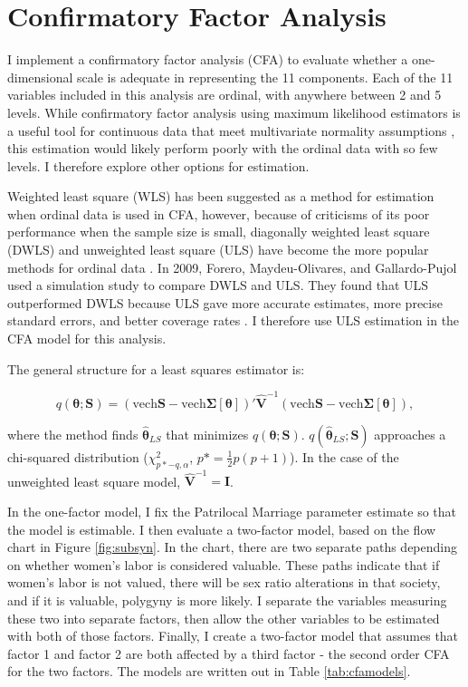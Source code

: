 \documentclass[letterpaper,11pt]{article}
\begin{document}
\section{Confirmatory Factor Analysis}

I implement a confirmatory factor analysis (CFA) to evaluate whether a one-dimensional scale is adequate in representing the 11 components. Each of the 11 variables included in this analysis are ordinal, with anywhere between 2 and 5 levels. While confirmatory factor analysis using maximum likelihood estimators is a useful tool for continuous data that meet multivariate normality assumptions \cite{albright}, this estimation would likely perform poorly with the ordinal data with so few levels. I therefore explore other options for estimation.

Weighted least square (WLS) has been suggested as a method for estimation when ordinal data is used in CFA, however, because of criticisms of its poor performance when the sample size is small, diagonally weighted least square (DWLS) and unweighted least square (ULS) have become the more popular methods for ordinal data \cite{li}. In 2009, Forero, Maydeu-Olivares, and Gallardo-Pujol used a simulation study to compare DWLS and ULS. They found that ULS outperformed DWLS because ULS gave more accurate estimates, more precise standard errors, and better coverage rates \cite{forero}. I therefore use ULS estimation in the CFA model for this analysis.

The general structure for a least squares estimator is:

\begin{equation}
q(\boldsymbol{\theta};\mathbf{S}) = (\text{vech} \mathbf{S} - \text{vech} \boldsymbol{\Sigma}[\boldsymbol{\theta}])' \hat{\mathbf{V}}^{-1}(\text{vech} \mathbf{S} - \text{vech} \boldsymbol{\Sigma}[\boldsymbol{\theta}]),
\end{equation}

where the method finds $\hat{\boldsymbol{\theta}}_{LS}$ that minimizes $q(\boldsymbol{\theta};\mathbf{S})$. $q(\hat{\boldsymbol{\theta}}_{LS};\mathbf{S})$ approaches a chi-squared distribution ($\chi^2_{p*-q,\alpha}$, $p*=\frac{1}{2}p(p+1)$). In the case of the unweighted least square model, $\hat{\mathbf{V}}^{-1}=\mathbf{I}$.

In the one-factor model, I fix the Patrilocal Marriage parameter estimate so that the model is estimable. I then evaluate a two-factor model, based on the flow chart in Figure \ref{fig:subsyn}. In the chart, there are two separate paths depending on whether women's labor is considered valuable. These paths indicate that if women's labor is not valued, there will be sex ratio alterations in that society, and if it is valuable, polygyny is more likely. I separate the variables measuring these two into separate factors, then allow the other variables to be estimated with both of those factors. Finally, I create a two-factor model that assumes that factor 1 and factor 2 are both affected by a third factor - the second order CFA for the two factors. The models are written out in Table \ref{tab:cfamodels}.
\end{document}
